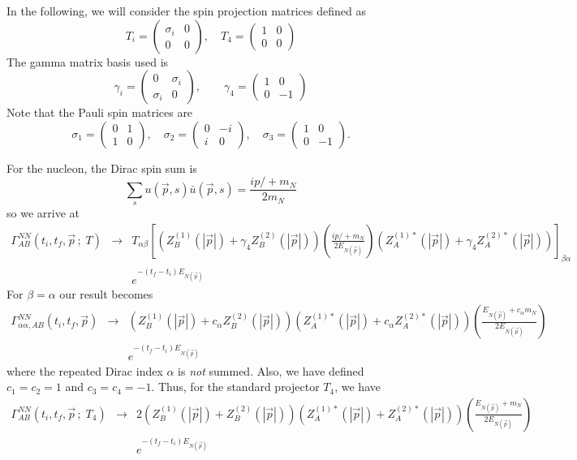 \documentclass[12pt]{article}
\begin{document}
In the following, we will consider the spin projection matrices defined as
\[
T_i = \begin{pmatrix}\sigma_i & 0 \\ 0 & 0 \end{pmatrix}, \quad
T_4 = \begin{pmatrix} 1 & 0 \\ 0 & 0 \end{pmatrix}
\]
The gamma matrix basis used is
\[
\gamma_i = \begin{pmatrix} 0 & \sigma_i \\ \sigma_i & 0 \end{pmatrix}, \qquad
\gamma_4 = \begin{pmatrix} 1 & 0 \\ 0 & -1 \end{pmatrix}
\]
Note that the Pauli spin matrices are
\begin{displaymath}
\sigma_1 = \begin{pmatrix} 0 & 1\\ 1 & 0 \end{pmatrix}, \quad
\sigma_2 = \begin{pmatrix} 0 & -i\\ i & 0 \end{pmatrix}, \quad
\sigma_3 = \begin{pmatrix} 1 & 0\\ 0 & -1 \end{pmatrix}.
\end{displaymath}

For the nucleon, the Dirac spin sum is
\[
\sum_su(\vec{p},s)\bar{u}(\vec{p},s) = \frac{ip\!\!/+m_N}{2m_N}
\]
so we arrive at
\begin{eqnarray}
\Gamma^{NN}_{AB}(t_i,t_f,\vec{p}\,;\;T) &\to&
T_{\alpha\beta}
\left[\left(Z_B^{(1)}(|\vec{p}|)+\gamma_4Z_B^{(2)}(|\vec{p}|)\right)
\left(\frac{ip\!\!/+m_N}{2E_{N(\vec{p})}}\right)
\left(Z_A^{(1)*}(|\vec{p}|)+\gamma_4Z_A^{(2)*}(|\vec{p}|)\right)
\right]_{\beta\alpha}
\nonumber \\
&& e^{-(t_f-t_i)E_{N(\vec{p})}} \nonumber
\end{eqnarray}
For $\beta=\alpha$ our result becomes
\begin{eqnarray}
\Gamma^{NN}_{\alpha\alpha,AB}(t_i,t_f,\vec{p}) &\to&
\left(Z_B^{(1)}(|\vec{p}|)+c_\alpha Z_B^{(2)}(|\vec{p}|)\right)
\left(Z_A^{(1)*}(|\vec{p}|)+c_\alpha Z_A^{(2)*}(|\vec{p}|)\right)
\left(\frac{E_{N(\vec{p})}+c_\alpha m_N}{2E_{N(\vec{p})}}\right)
\nonumber \\
&& e^{-(t_f-t_i)E_{N(\vec{p})}}
\end{eqnarray}
where the repeated Dirac index $\alpha$ is {\em not} summed.
Also, we have defined $c_1=c_2=1$ and $c_3=c_4=-1$. Thus, for the
standard projector $T_4$, we have
\begin{eqnarray}
\Gamma^{NN}_{AB}(t_i,t_f,\vec{p}\,;\;T_4) &\to&
2\left(Z_B^{(1)}(|\vec{p}|)+ Z_B^{(2)}(|\vec{p}|)\right)
\left(Z_A^{(1)*}(|\vec{p}|)+ Z_A^{(2)*}(|\vec{p}|)\right)
\left(\frac{E_{N(\vec{p})}+ m_N}{2E_{N(\vec{p})}}\right)
\nonumber \\
&& e^{-(t_f-t_i)E_{N(\vec{p})}}
\end{eqnarray}
\end{document}
